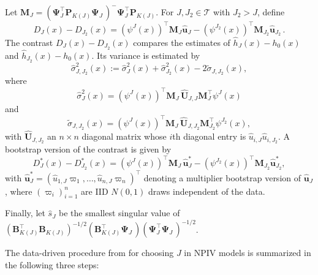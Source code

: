\documentclass[
]{jss}
\begin{document}
Let
\(\mathbf M_J = (\mathbf \Psi_J^\top \mathbf P_{K(J)}^{\phantom \top} \mathbf \Psi_J^{\phantom \top} )^{-} \mathbf \Psi_J^\top \mathbf P_{K(J)}^{\phantom \top}\).
For \(J,J_2 \in \mathcal T\) with \(J_2 > J\), define \[
D_{J}(x)-D_{J_2}(x) = (\psi^J(x))^\top \mathbf M_J \hat{\mathbf  u}_J - (\psi^{J_2}(x))^\top \mathbf M_{J_2} \hat{\mathbf u}_{J_2} \,.
\] The contrast \(D_{J}(x)-D_{J_2}(x)\) compares the estimates of
\(\hat h_J(x) - h_0(x)\) and \(\hat h_{J_2}(x) - h_0(x)\). Its variance
is estimated by \[
 \hat \sigma_{J,J_2}^2(x) := \hat \sigma_{J}^2(x) + \hat \sigma_{J_2}^2(x) - 2 \tilde \sigma_{J,J_2}(x),
\] where \[
 \hat \sigma_{J}^2(x) =  (\psi^J(x))^\top \mathbf M_J^{\phantom \top} \widehat{\mathbf U}_{J,J}^{\phantom \top} \mathbf M_J^\top \psi^J(x)
\] and \[
 \tilde \sigma_{J,J_2}(x)  = (\psi^J(x))^\top \mathbf M_J^{\phantom \top} \widehat{\mathbf U}_{J,J_2}^{\phantom \top} \mathbf M_{J_2}^\top \psi^{J_2}(x),
\] with \(\widehat{\mathbf U}_{J,J_2}\) an \(n\times n\) diagonal matrix
whose \(i\)th diagonal entry is \(\hat u_{i,J} \hat u_{i,J_2}\). A
bootstrap version of the contrast is given by \[
D_{J}^*(x)-D_{J_2}^*(x) = (\psi^J(x))^\top\mathbf M_J^{\phantom \top}  \hat{\mathbf u}_J^* - (\psi^{J_2}(x))^\top \mathbf M_{J_2}^{\phantom \top} \hat{\mathbf u}_{J_2}^*,
\] with
\(\hat{\mathbf u}_J^* = (\hat u_{1,J}\varpi_1,\ldots,\hat u_{n,J}\varpi_n)^\top\)
denoting a multiplier bootstrap version of \(\hat{\mathbf u}_J\), where
\((\varpi_i)_{i=1}^n\) are IID \(N(0,1)\) draws independent of the data.

Finally, let \(\hat s_J\) be the smallest singular value of
\((\mathbf B_{K(J)}^\top\mathbf B_{K(J)}^{\phantom \top})^{-1/2} (\mathbf B_{K(J)}^\top \mathbf \Psi_J^{\phantom \top}) (\mathbf \Psi_J^\top \mathbf \Psi_J^{\phantom \top})^{-1/2}\).

The data-driven procedure from \citet{CCK} for choosing \(J\) in NPIV
models is summarized in the following three steps:
\end{document}
